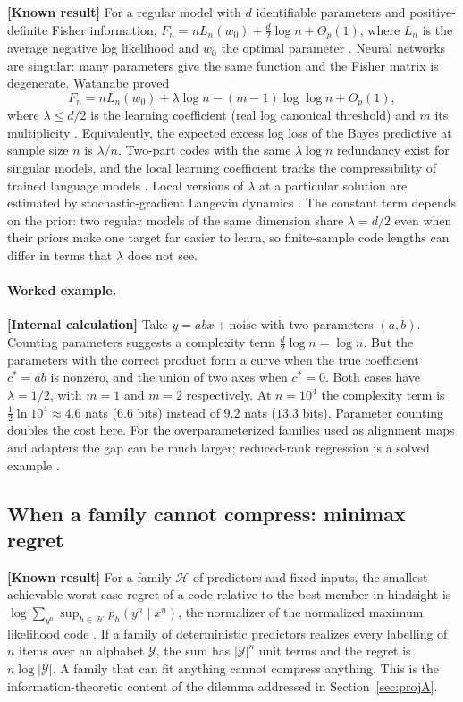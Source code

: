 \documentclass[11pt,a4paper]{article}
\newcommand{\evl}[2]{{\small\bfseries\color{#1}[#2]}}
\newcommand{\LKnown}{\evl{cknown}{Known result}}
\newcommand{\LCalc}{\evl{ccalc}{Internal calculation}}
\begin{document}
\LKnown{} For a regular model with $d$ identifiable parameters and
positive-definite Fisher information,
$F_n=nL_n(w_0)+\tfrac d2\log n+O_p(1)$, where $L_n$ is the average
negative log likelihood and $w_0$ the optimal parameter
\cite{rissanen1986,clarkebarron1990}. Neural networks are singular:
many parameters give the same function and the Fisher matrix is
degenerate. Watanabe proved
\begin{equation}
F_n=nL_n(w_0)+\lambda\log n-(m-1)\log\log n+O_p(1),
\label{eq:watanabe}
\end{equation}
where $\lambda\le d/2$ is the learning coefficient (real log canonical
threshold) and $m$ its multiplicity \cite{watanabe2009}. Equivalently,
the expected excess log loss of the Bayes predictive at sample size $n$
is $\lambda/n$. Two-part codes with the same $\lambda\log n$ redundancy
exist for singular models, and the local learning coefficient tracks
the compressibility of trained language models \cite{urdshals2025}.
Local versions of $\lambda$ at a particular solution are estimated by stochastic-gradient Langevin dynamics \cite{lau2025llc}. The constant term depends on the prior: two regular models of the same dimension share $\lambda=d/2$ even when their priors make one target far easier to learn, so finite-sample code lengths can differ in terms that $\lambda$ does not see.

\paragraph{Worked example.} \LCalc{} Take $y=abx+\text{noise}$ with two
parameters $(a,b)$. Counting parameters suggests a complexity term
$\tfrac d2\log n=\log n$. But the parameters with the correct product
form a curve when the true coefficient $c^*=ab$ is nonzero, and the
union of two axes when $c^*=0$. Both cases have $\lambda=1/2$, with
$m=1$ and $m=2$ respectively. At $n=10^4$ the complexity term is
$\tfrac12\ln10^4\approx4.6$ nats ($6.6$ bits) instead of $9.2$ nats
($13.3$ bits). Parameter counting doubles the cost here. For the
overparameterized families used as alignment maps and adapters the gap
can be much larger; reduced-rank regression is a solved example
\cite{aoyagiwatanabe2005}.

\subsection{When a family cannot compress: minimax regret}

\LKnown{} For a family $\mathcal H$ of predictors and fixed inputs, the
smallest achievable worst-case regret of a code relative to the best
member in hindsight is
$\log\sum_{y^n}\sup_{h\in\mathcal H}p_h(y^n\mid x^n)$, the normalizer of
the normalized maximum likelihood code \cite{shtarkov1987,grunwald2007}.
If a family of deterministic predictors realizes every labelling of $n$
items over an alphabet $\mathcal Y$, the sum has $|\mathcal Y|^n$ unit
terms and the regret is $n\log|\mathcal Y|$. A family that can fit
anything cannot compress anything. This is the information-theoretic
content of the dilemma addressed in Section~\ref{sec:projA}.
\end{document}
